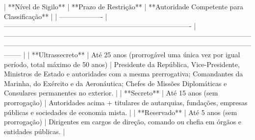 | **Nível de Sigilo** | **Prazo de Restrição**                                                             | **Autoridade Competente para Classificação**                                                                                                                                                                                     |
| ------------------- | ---------------------------------------------------------------------------------- | -------------------------------------------------------------------------------------------------------------------------------------------------------------------------------------------------------------------------------- |
| **Ultrassecreto**   | Até 25 anos (prorrogável uma única vez por igual período, total máximo de 50 anos) | Presidente da República, Vice-Presidente, Ministros de Estado e autoridades com a mesma prerrogativa; Comandantes da Marinha, do Exército e da Aeronáutica; Chefes de Missões Diplomáticas e Consulares permanentes no exterior. |
| **Secreto**         | Até 15 anos (sem prorrogação)                                                      | Autoridades acima + titulares de autarquias, fundações, empresas públicas e sociedades de economia mista.                                                                                                                        |
| **Reservado**       | Até 5 anos (sem prorrogação)                                                       | Dirigentes em cargos de direção, comando ou chefia em órgãos e entidades públicas.                                                                                                                                               |
